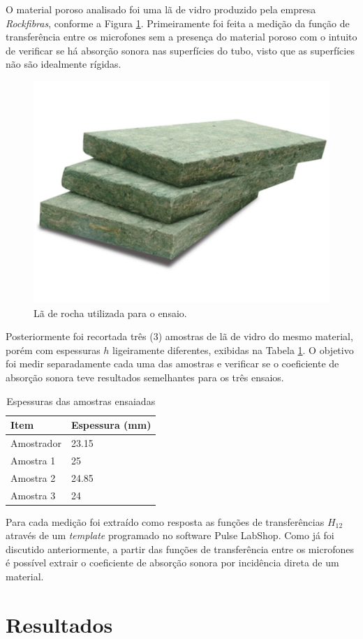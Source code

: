O material poroso analisado foi uma lã de vidro produzido pela empresa \textit{Rockfibras}, conforme a Figura \ref{fig.rockfibras}. Primeiramente foi feita a medição da função de transferência entre os microfones sem a presença do material poroso com o intuito de verificar se há absorção sonora nas superfícies do tubo, visto que as superfícies não são idealmente rígidas.
\begin{figure}[h]
\centering
\includegraphics[scale=0.35]{figs/rockfibras.jpg}
\caption{Lã de rocha utilizada para o ensaio.}
\label{fig.rockfibras}
\end{figure}



Posteriormente foi recortada três (3) amostras de lã de vidro do mesmo material, porém com espessuras $h$ ligeiramente diferentes, exibidas na Tabela \ref{tab.espessuras}. O objetivo foi medir separadamente cada uma das amostras e verificar se o coeficiente de absorção sonora teve resultados semelhantes para os três ensaios.

\begin{table}[h]
\centering
\caption{Espessuras das amostras ensaiadas}
\label{tab.espessuras}
\begin{tabular}{l|l}
Item                       & Espessura (mm)      \\ \hline
Amostrador                 & 23.15               \\
Amostra 1                  & 25                  \\
Amostra 2                  & 24.85               \\
Amostra 3                  & 24                  \\
\end{tabular}
\end{table}

Para cada medição foi extraído como resposta as funções de transferências $H_{12}$ através de um \textit{template} programado no software Pulse LabShop. Como já foi discutido anteriormente, a partir das funções de transferência entre os microfones é possível extrair o coeficiente de absorção sonora por incidência direta de um material.

\chapter{Resultados}